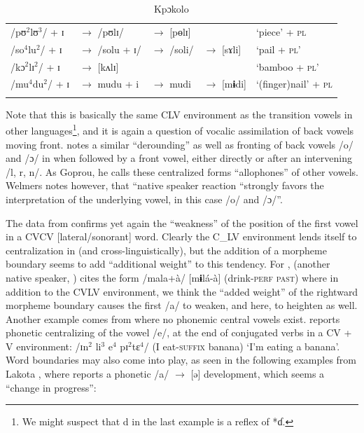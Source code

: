 \documentclass[output=paper,newtxmath,modfonts,nonflat]{langsci/langscibook}
\begin{document}
\begin{table}
\label{tab:zogbo:22}
\caption{Kpɔkolo \citep[202-206]{Goprou2014}}                                  
\begin{tabular}{lllll}
\lsptoprule
/pʊ$^2$lʊ$^3$/ + ɪ 
& $\rightarrow$ /pʊlɪ/  
& $\rightarrow$ [pɵlɪ]        
&
& ‘piece’ + \textsc{pl}   \\

/so$^4$lu$^2$/ + ɪ  
& $\rightarrow$ /solu + ɪ/ 
& $\rightarrow$ /soli/  
& $\rightarrow$ [sɤli]   
& ‘pail + \textsc{pl}’  \\

/kɔ$^2$lɪ$^2$/ + ɪ 
& $\rightarrow$ [kʌlɪ]     
& 
&     
& ‘bamboo + \textsc{pl}’   \\

/mu$^4$du$^2$/ + ɪ  
& $\rightarrow$ mudu + i  
& $\rightarrow$ mudi 
& $\rightarrow$ [m\textbf{ɨ}di]   
& ‘(finger)nail’ + \textsc{pl}\\
\lspbottomrule
\end{tabular}	
\end{table}

Note that this is basically the same CLV environment as the transition vowels in other languages\footnote{We might suspect that d in the last example is a reflex of *ɗ.}, and it is again a question of vocalic assimilation of back vowels moving front. \citet{Welmers1973} notes a similar “derounding” as well as fronting of back vowels /o/ and /ɔ/ in  when followed by a front vowel, either directly or after an intervening /l, r, n/. As Goprou, he calls these centralized forms “allophones” of other vowels. Welmers notes however, that “native speaker reaction “strongly favors the interpretation of the underlying vowel, in this case /o/ and /ɔ/”. 

The data from  confirms yet again the “weakness” of the position of the first vowel in a CVCV [lateral/sonorant] word. Clearly the C\_LV environment lends itself to centralization in  (and cross-linguistically), but the addition of a morpheme boundary seems to add “additional weight” to this tendency. For , \citeauthor{Kokora1976} (another native speaker, \citeyear[39]{Kokora1976}) cites the form /mala+à/ [m\textbf{ɨ}lá-à] (drink-\textsc{perf} \textsc{past}) where in addition to the CVLV environment, we think the “added weight” of the rightward morpheme boundary causes the first /a/ to weaken, and here, to heighten as well. Another example comes from { where no phonemic central vowels exist.} \citet[50]{Bentinck1978} reports phonetic centralizing of the vowel /e/, at the end of conjugated verbs in a CV + V environment:  /ɪn$^2$  li$^3$ e$^4$ pɪ$^2$tɛ$^4$/ (I eat-\textsc{suffix} banana) ‘I’m eating a banana’.  Word boundaries may also come into play, as seen in the following examples from Lakota , where \citet[47]{Guehoun1993} reports a phonetic /a/ $\rightarrow$ [ə] development, which seems a “change in progress”: 
\end{document}
